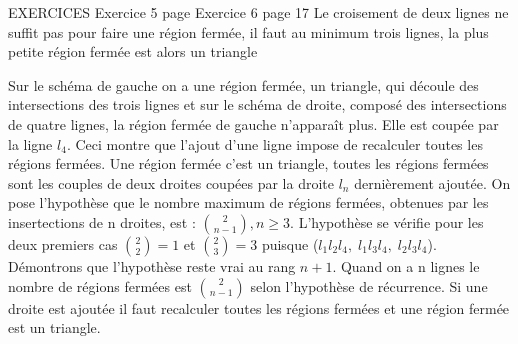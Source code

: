 \documentclass[9pt]{amsart}
\begin{document}
EXERCICES\newline\newline
Exercice 5 page
Exercice 6 page 17\newline
Le croisement de deux lignes ne suffit pas pour faire une r\'{e}gion ferm\'{e}e, il faut au minimum trois lignes, la plus petite r\'{e}gion ferm\'{e}e est alors un triangle \newline
{}\newline
Sur le sch\'{e}ma de gauche on a une r\'{e}gion ferm\'{e}e, un triangle, qui d\'{e}coule des intersections des trois lignes et sur le sch\'{e}ma de droite, compos\'{e} des intersections de quatre lignes, la r\'{e}gion ferm\'{e}e de gauche n'apparaît plus. Elle est coup\'{e}e par la ligne $l_4$. Ceci montre que l'ajout d'une ligne impose de recalculer toutes les r\'{e}gions ferm\'{e}es. \newline
Une r\'{e}gion ferm\'{e}e c'est un triangle, toutes les r\'{e}gions ferm\'{e}es sont les couples de deux droites coup\'{e}es par la droite $l_n$ derni\`{e}rement ajout\'{e}e. \newline\newline
On pose l'hypoth\`{e}se que le nombre maximum de r\'{e}gions ferm\'{e}es, obtenues  par les insertections de n droites, est :  $\binom{2}{n-1},  n\geq3$. \newline\newline
L'hypoth\`{e}se se v\'{e}rifie pour les deux premiers cas $\binom{2}{2} = 1$ et $\binom{2}{3} = 3$ puisque ($l_1l_2l_4,\; l_1l_3l_4,\; l_2l_3l_4$). D\'{e}montrons que l'hypoth\`{e}se reste vrai au rang $n+1$.
Quand on a n lignes le nombre de r\'{e}gions ferm\'{e}es est $\binom{2}{n-1}$ selon l'hypoth\`{e}se de r\'{e}currence. Si une droite est ajout\'{e}e il faut recalculer toutes les r\'{e}gions ferm\'{e}es et une r\'{e}gion ferm\'{e}e est un triangle. 
\end{document}
